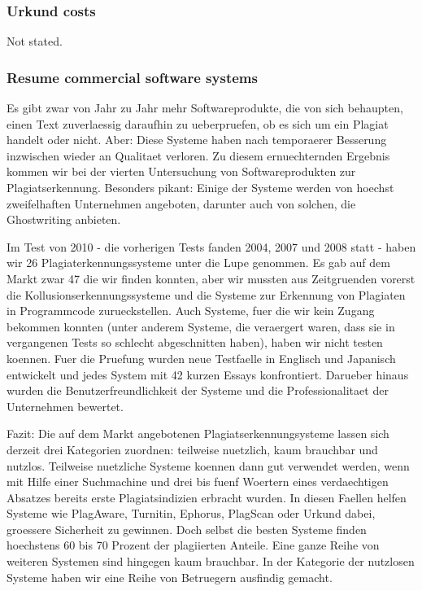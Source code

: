 \subsubsection{Urkund costs}
Not stated.


\newpage

\subsubsection{Resume commercial software systems}



Es gibt zwar von Jahr zu Jahr mehr Softwareprodukte, die von sich behaupten, einen Text 
zuverlaessig daraufhin zu ueberpruefen, ob es sich um ein Plagiat handelt oder nicht. Aber: Diese Systeme haben nach temporaerer Besserung inzwischen wieder an Qualitaet verloren. Zu diesem ernuechternden Ergebnis kommen wir bei der  vierten Untersuchung von Softwareprodukten zur Plagiatserkennung. Besonders pikant: Einige der Systeme werden von hoechst zweifelhaften Unternehmen angeboten, darunter auch von solchen, die Ghostwriting anbieten.

Im Test von 2010 - die vorherigen Tests fanden 2004, 2007 und 2008 statt - haben wir 26 Plagiaterkennungssysteme unter die Lupe genommen. Es gab auf dem Markt zwar 47 die wir finden konnten, aber wir mussten aus Zeitgruenden vorerst die Kollusionserkennungssysteme und die Systeme zur Erkennung von Plagiaten in Programmcode zurueckstellen. Auch Systeme, fuer die wir kein Zugang bekommen konnten (unter anderem Systeme, die veraergert waren, dass sie in vergangenen Tests so schlecht abgeschnitten haben), haben wir nicht testen koennen.  Fuer die Pruefung wurden neue Testfaelle in Englisch und Japanisch entwickelt und jedes System mit 42 kurzen Essays konfrontiert. Darueber hinaus wurden die Benutzerfreundlichkeit der Systeme und die Professionalitaet der Unternehmen bewertet.




Fazit: Die auf dem Markt angebotenen Plagiatserkennungsysteme lassen sich derzeit drei Kategorien zuordnen: teilweise nuetzlich, kaum brauchbar und nutzlos. Teilweise nuetzliche Systeme koennen dann gut verwendet werden, wenn mit Hilfe einer Suchmachine und drei bis fuenf Woertern eines verdaechtigen Absatzes bereits erste Plagiatsindizien erbracht wurden. In diesen Faellen helfen Systeme wie PlagAware, Turnitin, Ephorus, PlagScan oder Urkund dabei, groessere Sicherheit zu gewinnen. Doch selbst die besten Systeme finden hoechstens 60 bis 70 Prozent der plagiierten Anteile. Eine ganze Reihe von weiteren Systemen sind hingegen kaum brauchbar. In der Kategorie der nutzlosen Systeme haben wir eine Reihe von Betruegern ausfindig gemacht.

